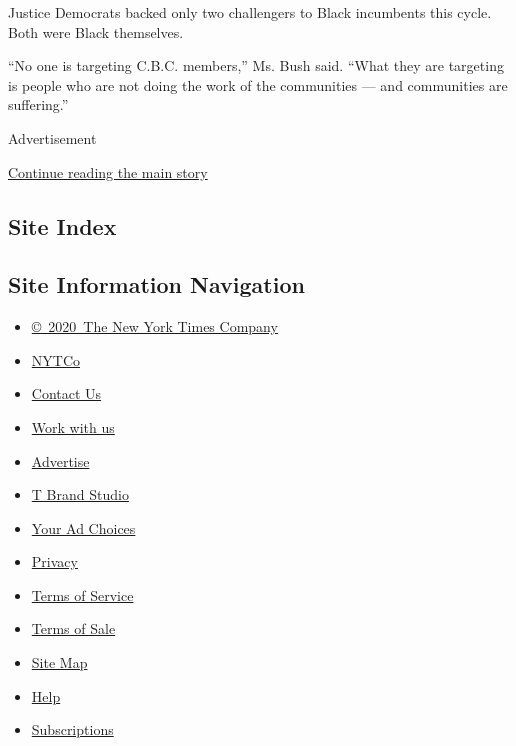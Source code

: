 Justice Democrats backed only two challengers to Black incumbents this
cycle. Both were Black themselves.

``No one is targeting C.B.C. members,'' Ms. Bush said. ``What they are
targeting is people who are not doing the work of the communities ---
and communities are suffering.''

Advertisement

\protect\hyperlink{after-bottom}{Continue reading the main story}

\hypertarget{site-index}{%
\subsection{Site Index}\label{site-index}}

\hypertarget{site-information-navigation}{%
\subsection{Site Information
Navigation}\label{site-information-navigation}}

\begin{itemize}
\tightlist
\item
  \href{https://help.nytimes.com/hc/en-us/articles/115014792127-Copyright-notice}{©~2020~The
  New York Times Company}
\end{itemize}

\begin{itemize}
\tightlist
\item
  \href{https://www.nytco.com/}{NYTCo}
\item
  \href{https://help.nytimes.com/hc/en-us/articles/115015385887-Contact-Us}{Contact
  Us}
\item
  \href{https://www.nytco.com/careers/}{Work with us}
\item
  \href{https://nytmediakit.com/}{Advertise}
\item
  \href{http://www.tbrandstudio.com/}{T Brand Studio}
\item
  \href{https://www.nytimes.com/privacy/cookie-policy\#how-do-i-manage-trackers}{Your
  Ad Choices}
\item
  \href{https://www.nytimes.com/privacy}{Privacy}
\item
  \href{https://help.nytimes.com/hc/en-us/articles/115014893428-Terms-of-service}{Terms
  of Service}
\item
  \href{https://help.nytimes.com/hc/en-us/articles/115014893968-Terms-of-sale}{Terms
  of Sale}
\item
  \href{https://spiderbites.nytimes.com}{Site Map}
\item
  \href{https://help.nytimes.com/hc/en-us}{Help}
\item
  \href{https://www.nytimes.com/subscription?campaignId=37WXW}{Subscriptions}
\end{itemize}
